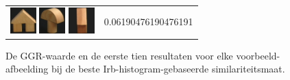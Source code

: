 \begin{figure}[tbp]
\begin{center}
\begin{tabular}{m{11cm} | m{3cm} |}
\includegraphics[width=1cm]{coil/beeld-42.eps}
\includegraphics[width=1cm]{coil/beeld-4.eps}
\includegraphics[width=1cm]{coil/beeld-44.eps}
& {\scriptsize 0.06190476190476191}
\end{tabular}
\caption{\label{fig:results_irb_histgeb}De GGR-waarde en de eerste tien resultaten voor elke voorbeeld-afbeelding bij de beste Irb-histogram-gebaseerde similariteitsmaat.}
\end{center}
\end{figure}

